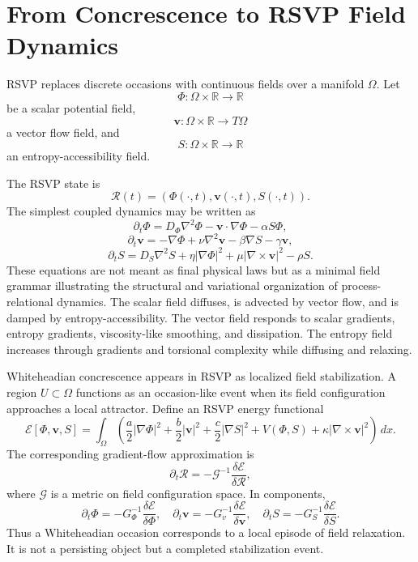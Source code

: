 \documentclass[12pt,a4paper]{article}
\begin{document}
\section{From Concrescence to RSVP Field Dynamics}

RSVP replaces discrete occasions with continuous fields over a manifold \(\Omega\). Let
\[
\Phi : \Omega \times \mathbb{R} \to \mathbb{R}
\]
be a scalar potential field,
\[
\mathbf{v} : \Omega \times \mathbb{R} \to T\Omega
\]
a vector flow field, and
\[
S : \Omega \times \mathbb{R} \to \mathbb{R}
\]
an entropy-accessibility field.

The RSVP state is
\[
\mathcal{R}(t) = (\Phi(\cdot,t),\mathbf{v}(\cdot,t),S(\cdot,t)).
\]
The simplest coupled dynamics may be written as
\[
\partial_t \Phi
=
D_\Phi \nabla^2 \Phi
-
\mathbf{v}\cdot\nabla \Phi
-
\alpha S\Phi,
\]
\[
\partial_t \mathbf{v}
=
-\nabla \Phi
+
\nu \nabla^2 \mathbf{v}
-
\beta \nabla S
-
\gamma \mathbf{v},
\]
\[
\partial_t S
=
D_S \nabla^2 S
+
\eta |\nabla \Phi|^2
+
\mu |\nabla \times \mathbf{v}|^2
-
\rho S.
\]
These equations are not meant as final physical laws but as a minimal field grammar illustrating the structural and variational organization of process-relational dynamics. The scalar field diffuses, is advected by vector flow, and is damped by entropy-accessibility. The vector field responds to scalar gradients, entropy gradients, viscosity-like smoothing, and dissipation. The entropy field increases through gradients and torsional complexity while diffusing and relaxing.

Whiteheadian concrescence appears in RSVP as localized field stabilization. A region \(U \subset \Omega\) functions as an occasion-like event when its field configuration approaches a local attractor. Define an RSVP energy functional
\[
\mathcal{E}[\Phi,\mathbf{v},S]
=
\int_\Omega
\left(
\frac{a}{2}|\nabla \Phi|^2
+
\frac{b}{2}|\mathbf{v}|^2
+
\frac{c}{2}|\nabla S|^2
+
V(\Phi,S)
+
\kappa |\nabla \times \mathbf{v}|^2
\right)
\,dx.
\]
The corresponding gradient-flow approximation is
\[
\partial_t \mathcal{R}
=
-\mathcal{G}^{-1}\frac{\delta \mathcal{E}}{\delta \mathcal{R}},
\]
where \(\mathcal{G}\) is a metric on field configuration space. In components,
\[
\partial_t \Phi = -G_\Phi^{-1}\frac{\delta \mathcal{E}}{\delta \Phi},
\quad
\partial_t \mathbf{v} = -G_v^{-1}\frac{\delta \mathcal{E}}{\delta \mathbf{v}},
\quad
\partial_t S = -G_S^{-1}\frac{\delta \mathcal{E}}{\delta S}.
\]
Thus a Whiteheadian occasion corresponds to a local episode of field relaxation. It is not a persisting object but a completed stabilization event.
\end{document}
